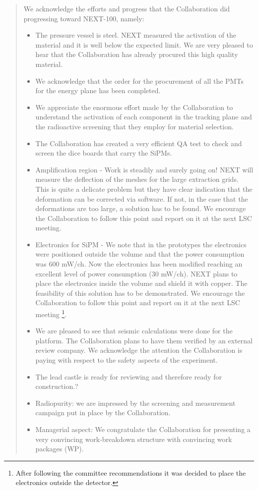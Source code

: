 \begin{quotation}
We acknowledge the efforts and progress that the Collaboration did progressing toward NEXT-100, namely:
\begin{itemize}
\item The pressure vessel is steel. NEXT measured the activation of the material and it is well below the expected limit. We are very pleased to hear that the Collaboration has already procured this high quality material. 
\item We acknowledge that the order for the procurement of all the PMTs for the energy plane has been completed.
\item We appreciate the enormous effort made by the Collaboration to understand the activation of each component in the tracking plane and the radioactive screening that they employ for material selection.
\item The Collaboration has created a very efficient QA test to check and screen the dice boards that carry the SiPMs.
\item Amplification region - Work is steadily and surely going on! NEXT will measure the deflection of the meshes for the large extraction grids. This is quite a delicate problem but they have clear indication that the deformation can be corrected via software. If not, in the case that the deformations are too large, a solution has to be found. We encourage the Collaboration to follow this point and report on it at the next LSC meeting.
\item Electronics for SiPM - We note that in the prototypes the electronics were positioned outside the volume and that the power consumption was 600 mW/ch. Now the electronics has been modified reaching an excellent level of power consumption (30 mW/ch). NEXT plans to place the electronics inside the volume and shield it with copper. The feasibility of this solution has to be demonstrated.  We encourage the Collaboration to follow this point and report on it at the next LSC meeting \footnote{After following the committee recommendations it was decided to place the electronics outside the detector.}.
\item We are pleased to see that seismic calculations were done for the platform. The Collaboration plans to have them verified by an external review company. We acknowledge the attention the Collaboration is paying with respect to the safety aspects of the experiment.
\item The lead castle is ready for reviewing and therefore ready for construction.?
\item Radiopurity: we are impressed by the screening and measurement campaign put in place by the Collaboration.
\item Managerial aspect: We congratulate the Collaboration for presenting a very convincing work-breakdown structure with convincing work packages (WP).
\end{itemize}
	

\end{quotation}
